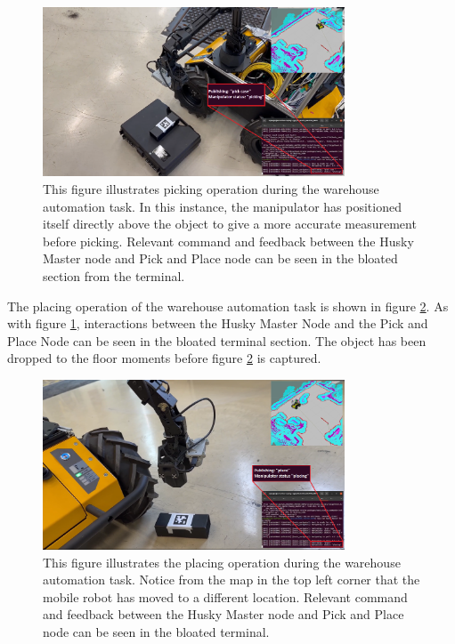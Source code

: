 \begin{figure}[htp!]
  \centering
  \includegraphics[width = 0.8\textwidth]{Figures/figHuskyFinalExperiment2.png}
  \caption{This figure illustrates picking operation during the warehouse automation task. In this instance, the manipulator has positioned itself directly above the object to give a more accurate measurement before picking. Relevant command and feedback between the Husky Master node and Pick and Place node can be seen in the bloated section from the terminal.}
  \label{fig:R:WA:finalExperiment2}
\end{figure}


The placing operation of the warehouse automation task is shown in figure \ref{fig:R:WA:finalExperiment4}. As with figure \ref{fig:R:WA:finalExperiment2}, interactions between the Husky Master Node and the Pick and Place Node can be seen in the bloated terminal section. The object has been dropped to the floor moments before figure \ref{fig:R:WA:finalExperiment4} is captured.

\begin{figure}[htp!]
  \centering
  \includegraphics[width = 0.8\textwidth]{Figures/figHuskyFinalExperiment4.png}
  \caption{This figure illustrates the placing operation during the warehouse automation task. Notice from the map in the top left corner that the mobile robot has moved to a different location. Relevant command and feedback between the Husky Master node and Pick and Place node can be seen in the bloated terminal.}
  \label{fig:R:WA:finalExperiment4}
\end{figure}

